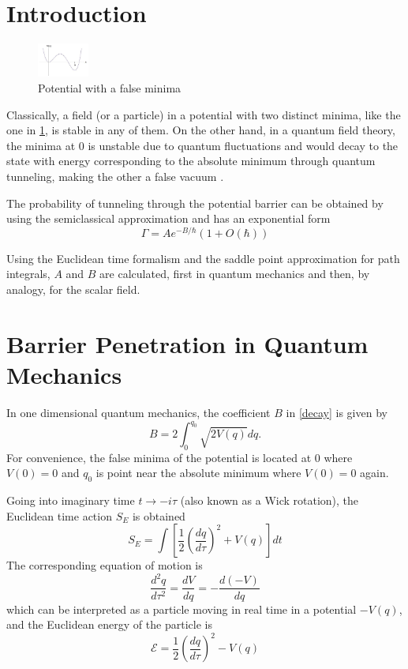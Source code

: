 \documentclass[a0,portrait]{a0poster}
\begin{document}
\begin{multicols}{3} 
\section{Introduction}
\begin{figure}
	\caption{Potential with a false minima}
	\label{potencial} 
	\centering
	\includegraphics[width=0.15\textwidth]{potencial.png}
\end{figure}
Classically, a field (or a particle) in a potential with two distinct minima, like the one in \ref{potencial}, is stable in any of them. On the other hand, in a quantum field theory, the minima at $0$ is unstable due to quantum fluctuations and would decay to the state with energy corresponding to the absolute minimum through quantum tunneling, making the other a false vacuum . 


The probability of tunneling through the potential barrier can be obtained by using the semiclassical approximation and has an exponential form \cite{coleman}
\begin{equation}\label{decay}
\Gamma = A e^{-B/\hbar} (1 + O(\hbar))
\end{equation}

Using the Euclidean time formalism and the saddle point approximation for path integrals, $A$ and $B$ are calculated, first in quantum mechanics and then, by analogy, for the scalar field. 

\section{Barrier Penetration in Quantum Mechanics}
In one dimensional quantum mechanics, the coefficient $B$ in \eqref{decay} is given by
\begin{equation}\label{B}
B = 2 \int_{0}^{q_0} \sqrt{2V(q)}dq.
\end{equation}
For convenience, the false minima of the potential is located at 0 where $V(0) = 0$ and $q_0$ is point near the absolute minimum where $V(0) = 0$ again. 

Going into imaginary time $t \rightarrow -i\tau$ (also known as a Wick rotation), the Euclidean time action $S_E$ is obtained
\begin{equation}\label{eucliaction}
S_E =  \int \left[ \frac{1}{2}\left(\frac{dq}{d\tau}\right)^2 + V(q) \right] dt
\end{equation}
The corresponding equation of motion is
\begin{equation}
\frac{d^2 q}{d\tau^2} = \frac{dV}{dq} = -\frac{d(-V)}{dq}
\end{equation}
which can be interpreted as a particle moving in real time in a potential $-V(q)$, and the Euclidean energy of the particle is
\begin{equation}
\mathcal{E} =  \frac{1}{2}\left(\frac{dq}{d\tau}\right)^2 - V(q)
\end{equation}


\end{multicols}
\end{document}
